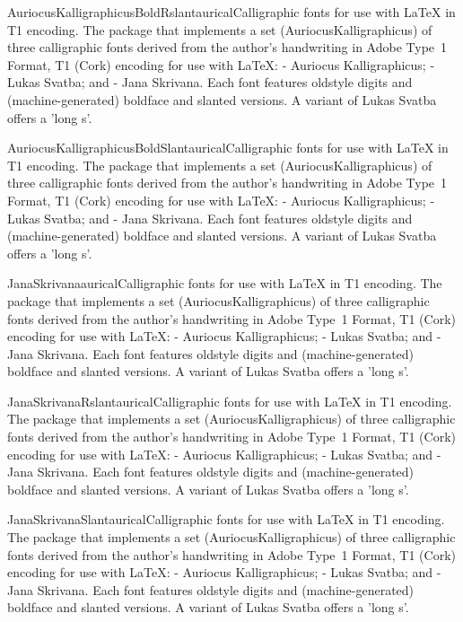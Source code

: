 \documentclass{ddltxtyp}
\begin{document}
\begin{package}{AuriocusKalligraphicusBoldRslant}{aurical}{Calligraphic fonts for use with {\LaTeX} in T1 encoding.}
The package that implements a set (AuriocusKalligraphicus) of
three calligraphic fonts derived from the author's handwriting
in Adobe Type~1 Format, T1 (Cork) encoding for use with {\LaTeX}:
- Auriocus Kalligraphicus; - Lukas Svatba; and - Jana Skrivana.
Each font features oldstyle digits and (machine-generated)
boldface and slanted versions. A variant of Lukas Svatba offers
a 'long s'.
\end{package}
\begin{package}{AuriocusKalligraphicusBoldSlant}{aurical}{Calligraphic fonts for use with {\LaTeX} in T1 encoding.}
The package that implements a set (AuriocusKalligraphicus) of
three calligraphic fonts derived from the author's handwriting
in Adobe Type~1 Format, T1 (Cork) encoding for use with {\LaTeX}:
- Auriocus Kalligraphicus; - Lukas Svatba; and - Jana Skrivana.
Each font features oldstyle digits and (machine-generated)
boldface and slanted versions. A variant of Lukas Svatba offers
a 'long s'.
\end{package}
\begin{package}{JanaSkrivana}{aurical}{Calligraphic fonts for use with {\LaTeX} in T1 encoding.}
The package that implements a set (AuriocusKalligraphicus) of
three calligraphic fonts derived from the author's handwriting
in Adobe Type~1 Format, T1 (Cork) encoding for use with {\LaTeX}:
- Auriocus Kalligraphicus; - Lukas Svatba; and - Jana Skrivana.
Each font features oldstyle digits and (machine-generated)
boldface and slanted versions. A variant of Lukas Svatba offers
a 'long s'.
\end{package}
\begin{package}{JanaSkrivanaRslant}{aurical}{Calligraphic fonts for use with {\LaTeX} in T1 encoding.}
The package that implements a set (AuriocusKalligraphicus) of
three calligraphic fonts derived from the author's handwriting
in Adobe Type~1 Format, T1 (Cork) encoding for use with {\LaTeX}:
- Auriocus Kalligraphicus; - Lukas Svatba; and - Jana Skrivana.
Each font features oldstyle digits and (machine-generated)
boldface and slanted versions. A variant of Lukas Svatba offers
a 'long s'.
\end{package}
\begin{package}{JanaSkrivanaSlant}{aurical}{Calligraphic fonts for use with {\LaTeX} in T1 encoding.}
The package that implements a set (AuriocusKalligraphicus) of
three calligraphic fonts derived from the author's handwriting
in Adobe Type~1 Format, T1 (Cork) encoding for use with {\LaTeX}:
- Auriocus Kalligraphicus; - Lukas Svatba; and - Jana Skrivana.
Each font features oldstyle digits and (machine-generated)
boldface and slanted versions. A variant of Lukas Svatba offers
a 'long s'.
\end{package}
\end{document}

